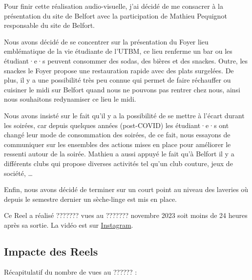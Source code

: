 Pour finir cette réalisation audio-visuelle, j'ai décidé de me consacrer à la présentation du site de Belfort avec la participation de Mathieu Pequignot responsable du site de Belfort.

Nous avons décidé de se concentrer sur la présentation du Foyer lieu emblématique de la vie étudiante de l'\gls{UTBM}, ce lieu renferme un bar ou les étudiant·e·s peuvent consommer des sodas, des bières et des snackes.
Outre, les snackes le Foyer propose une restauration rapide avec des plats surgelées.
De plus, il y a une possibilité très peu connue qui permet de faire réchauffer ou cuisiner le midi sur Belfort quand nous ne pouvons pas rentrer chez nous, ainsi nous souhaitons redynamiser ce lieu le midi.

Nous avons insisté sur le fait qu'il y a la possibilité de se mettre à l'écart durant les soirées, car depuis quelques années (post-COVID) les étudiant·e·s ont changé leur mode de consommation des soirées, de ce fait, nous essayons de communiquer sur les ensembles des actions mises en place pour améliorer le ressenti autour de la soirée.
Mathieu a aussi appuyé le fait qu'à Belfort il y a différents clubs qui propose diverses activités tel qu'un club couture, jeux de société, \ldots

Enfin, nous avons décidé de terminer sur un court point au niveau des laveries où depuis le semestre dernier un sèche-linge est mis en place.

Ce Reel a réalisé ??????? vues au ??????? novembre 2023 soit moins de 24 heures après sa sortie.
La vidéo est sur \href{https://www.instagram.com/reel/CzjfX8Xs5X1/?utm_source=ig_web_copy_link&igshid=MzRlODBiNWFlZA==}{Instagram}.


\subsection{Impacte des Reels}\label{subsec:impacte-des-reels}


Récapitulatif du nombre de vues au ?????? :

